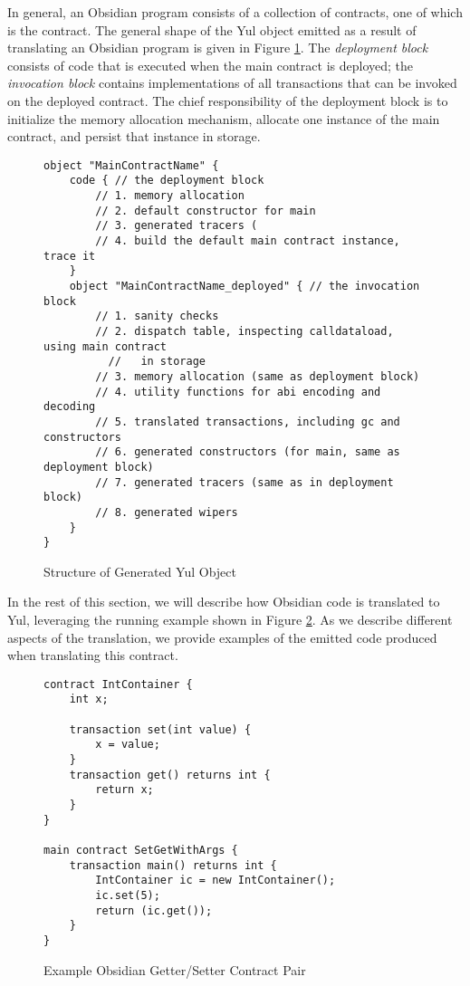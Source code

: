 In general, an Obsidian program consists of a collection of contracts, one of which is the  contract. The general shape of the
Yul object emitted as a result of translating an Obsidian program is given in
Figure \ref{code.1}. The \emph{deployment block} consists of code that is executed when the main contract is deployed; the \emph{invocation block} contains implementations of all transactions that can be invoked on the deployed contract. The chief responsibility of the deployment block is to initialize the memory allocation mechanism, allocate one instance of the main contract, and persist that instance in storage.


\begin{figure}[hbtp]
    \caption{Structure of Generated Yul Object}
    \label{code.1}
    \begin{lstlisting}[language=yul,frame=single,numbers=none]
object "MainContractName" {
    code { // the deployment block
        // 1. memory allocation 
        // 2. default constructor for main 
        // 3. generated tracers (
        // 4. build the default main contract instance, trace it
    }
    object "MainContractName_deployed" { // the invocation block
        // 1. sanity checks
        // 2. dispatch table, inspecting calldataload, using main contract
          //   in storage
        // 3. memory allocation (same as deployment block)
        // 4. utility functions for abi encoding and decoding
        // 5. translated transactions, including gc and constructors
        // 6. generated constructors (for main, same as deployment block)
        // 7. generated tracers (same as in deployment block)
        // 8. generated wipers
    }
}
    \end{lstlisting}
\end{figure}

In the rest of this section, we will describe how Obsidian code is translated to Yul, leveraging the running example shown in Figure \ref{code.2}. As we describe different
aspects of the translation, we provide examples of the emitted code
produced when translating this contract. 



\begin{figure}[hbtp]
    \caption{Example Obsidian Getter/Setter Contract Pair}
    \label{code.2}
    \begin{lstlisting}[language=obsidian,frame=single,numbers=none]
contract IntContainer {
    int x;

    transaction set(int value) {
        x = value;
    }
    transaction get() returns int {
        return x;
    }
}

main contract SetGetWithArgs {
    transaction main() returns int {
        IntContainer ic = new IntContainer();
        ic.set(5);
        return (ic.get());
    }
}
    \end{lstlisting}
\end{figure}



